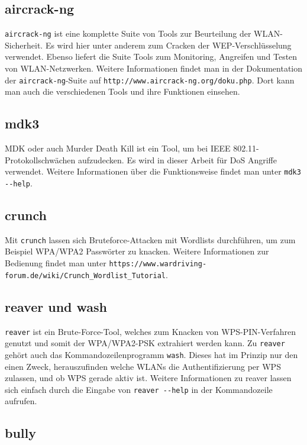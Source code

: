 \subsection{aircrack-ng}
\colorbox{altgray}{\lstinline|aircrack-ng|} ist eine komplette Suite von Tools zur Beurteilung der WLAN-Sicherheit. Es wird hier unter anderem zum Cracken der WEP-Verschlüsselung verwendet. Ebenso liefert die Suite Tools zum Monitoring, Angreifen und Testen von WLAN-Netzwerken. Weitere Informationen findet man in der Dokumentation der \colorbox{altgray}{\lstinline|aircrack-ng|}-Suite auf \colorbox{altgray}{\lstinline|http://www.aircrack-ng.org/doku.php|}. Dort kann man auch die verschiedenen Tools und ihre Funktionen einsehen.

\subsection{mdk3}
MDK oder auch Murder Death Kill ist ein Tool, um bei IEEE 802.11-Protokollschwächen aufzudecken. Es wird in dieser Arbeit für DoS Angriffe verwendet. Weitere Informationen über die Funktionsweise findet man unter \colorbox{altgray}{\lstinline|mdk3 --help|}.

\subsection{crunch}
Mit \colorbox{altgray}{\lstinline|crunch|} lassen sich Bruteforce-Attacken mit Wordlists durchführen, um zum Beispiel WPA/WPA2 Passwörter zu knacken. Weitere Informationen zur Bedienung findet man unter \colorbox{altgray}{\lstinline|https://www.wardriving-forum.de/wiki/Crunch_Wordlist_Tutorial|}.


\subsection{reaver und wash}
\colorbox{altgray}{\lstinline|reaver|} ist ein Brute-Force-Tool, welches zum Knacken von WPS-PIN-Verfahren genutzt und somit der WPA/WPA2-PSK extrahiert werden kann. Zu \colorbox{altgray}{\lstinline|reaver|} gehört auch das Kommandozeilenprogramm \colorbox{altgray}{\lstinline|wash|}. Dieses hat im Prinzip nur den einen Zweck, herauszufinden welche WLANs die Authentifizierung per WPS zulassen, und ob WPS gerade aktiv ist. Weitere Informationen zu reaver lassen sich einfach durch die Eingabe von \colorbox{altgray}{\lstinline|reaver --help|} in der Kommandozeile aufrufen.

\subsection{bully}

